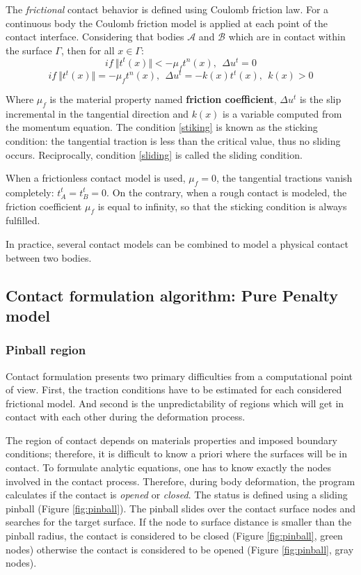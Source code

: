 The \textit{frictional} contact behavior is defined using Coulomb friction law. For a continuous body the Coulomb friction model is applied at each point of the contact interface.
Considering that bodies $\mathcal{A}$ and $\mathcal{B}$ which are in contact within the surface $\Gamma$, then for all $x \in \Gamma$:
\begin{equation}
\label{stiking}
if \ \Vert t^t(x) \Vert < -\mu_f t^n(x),\ \ \Delta u^t=0 
\end{equation}
\begin{equation}
\label{sliding}
if \ \Vert t^t(x) \Vert = -\mu_f t^n(x),\ \ \Delta u^t=-k(x)t^t(x),\ \ k(x)>0
\end{equation}

Where $\mu_f$ is the material property named \textbf{friction coefficient},  $\Delta u^t$ is the slip incremental in the tangential direction and $k(x)$ is a variable computed from the momentum equation. The condition \ref{stiking} is known as the sticking condition: the tangential traction is less than the critical value, thus no sliding occurs. Reciprocally, condition \ref{sliding} is called the sliding condition.

When a frictionless contact model is used, $\mu_f = 0$, the tangential tractions vanish completely: $t_A^t = t_B^t = 0$. On the contrary, when a rough contact is modeled, the friction coefficient $\mu_f$ is equal to infinity, so that the sticking condition is always fulfilled. 

In practice, several contact models can be combined to model a physical contact between two bodies.   

\subsection{Contact formulation algorithm: Pure Penalty model}%

\subsubsection*{Pinball region}

Contact formulation presents two primary difficulties from a computational point of view. First, the traction conditions have to be estimated for each considered frictional model. And second is the unpredictability of regions which will get in contact with each other during the deformation process.

The region of contact depends on materials properties and imposed boundary conditions; therefore, it is difficult to know a priori where the surfaces will be in contact. To formulate analytic equations, one has to know exactly the nodes involved in the contact process. Therefore, during body deformation, the program calculates if the contact is \textit{opened} or \textit{closed}. The status is defined using a sliding pinball (Figure \ref{fig:pinball}). The pinball slides over the contact surface nodes and searches for the target surface. If the node to surface distance is smaller than the pinball radius, the contact is considered to be closed (Figure \ref{fig:pinball}, green nodes) otherwise the contact is considered to be opened (Figure \ref{fig:pinball}, gray nodes).    


